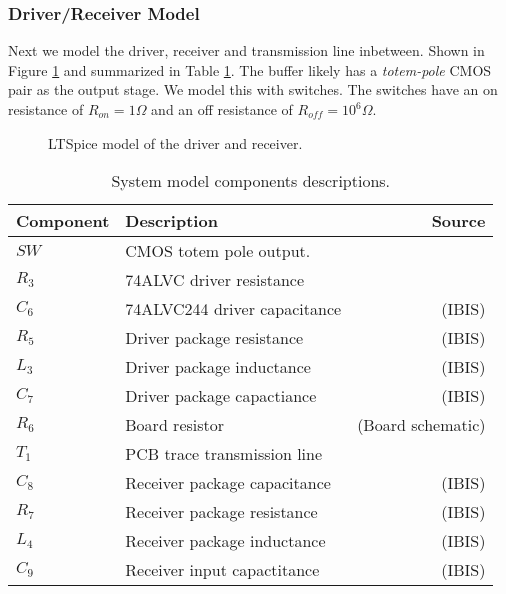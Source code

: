 \documentclass[../main.tex]{subfiles}
\begin{document}
\subsubsection{Driver/Receiver Model}

Next we model the driver, receiver and transmission line inbetween. Shown in Figure \ref{fig:driver} and summarized in Table \ref{tab:driver}. The buffer likely has a \textit{totem-pole} CMOS pair as the output stage. We model this with switches. The switches have an on resistance of $R_{on} = 1\si{\Omega}$ and an off resistance of $R_{off} = 10^6\si{\Omega}$.

\begin{figure}[h]
    \centering
    \caption{LTSpice model of the driver and receiver.}
    \label{fig:driver}
\end{figure}

\newpage

\begin{table}[h]
    \centering
    \begin{tabular}{l|l r}
        \toprule[1pt]
        \textbf{Component} & \textbf{Description} & \textbf{Source}\\
        \midrule
        $SW$    & CMOS totem pole output.       & \\
        $R_3$   & 74ALVC driver resistance      & \\
        $C_6$   & 74ALVC244 driver capacitance  & (IBIS) \\
        $R_5$   & Driver package resistance     & (IBIS) \\
        $L_3$   & Driver package inductance     & (IBIS) \\
        $C_7$   & Driver package capactiance    & (IBIS) \\
        $R_6$   & Board resistor                & (Board schematic)\\
        $T_1$   & PCB trace transmission line   & \\
        $C_8$   & Receiver package capacitance  & (IBIS) \\
        $R_7$   & Receiver package resistance   & (IBIS) \\
        $L_4$   & Receiver package inductance   & (IBIS) \\
        $C_9$   & Receiver input capactitance   & (IBIS) \\
        \bottomrule[1pt]
    \end{tabular}
    \caption{System model components descriptions.}
    \label{tab:driver}
\end{table}
\end{document}
